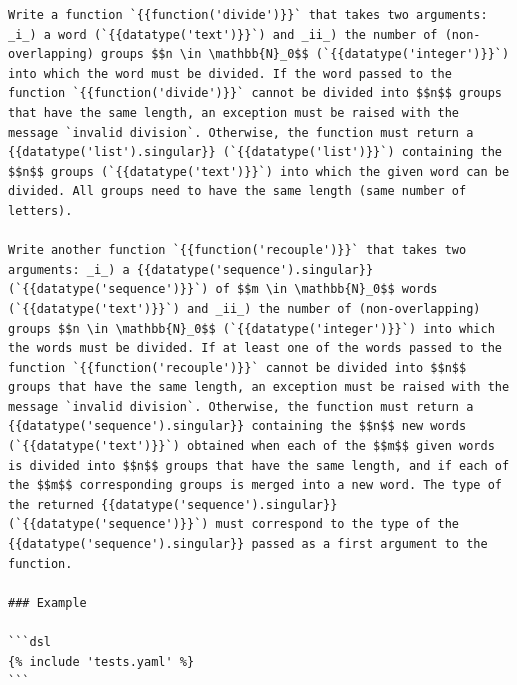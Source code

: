 \documentclass[../main]{subfiles}
\begin{document}
\begin{listing}
    \begin{verbatim}
Write a function `{{function('divide')}}` that takes two arguments: _i_) a word (`{{datatype('text')}}`) and _ii_) the number of (non-overlapping) groups $$n \in \mathbb{N}_0$$ (`{{datatype('integer')}}`) into which the word must be divided. If the word passed to the function `{{function('divide')}}` cannot be divided into $$n$$ groups that have the same length, an exception must be raised with the message `invalid division`. Otherwise, the function must return a {{datatype('list').singular}} (`{{datatype('list')}}`) containing the $$n$$ groups (`{{datatype('text')}}`) into which the given word can be divided. All groups need to have the same length (same number of letters).

Write another function `{{function('recouple')}}` that takes two arguments: _i_) a {{datatype('sequence').singular}} (`{{datatype('sequence')}}`) of $$m \in \mathbb{N}_0$$ words (`{{datatype('text')}}`) and _ii_) the number of (non-overlapping) groups $$n \in \mathbb{N}_0$$ (`{{datatype('integer')}}`) into which the words must be divided. If at least one of the words passed to the function `{{function('recouple')}}` cannot be divided into $$n$$ groups that have the same length, an exception must be raised with the message `invalid division`. Otherwise, the function must return a {{datatype('sequence').singular}} containing the $$n$$ new words (`{{datatype('text')}}`) obtained when each of the $$m$$ given words is divided into $$n$$ groups that have the same length, and if each of the $$m$$ corresponding groups is merged into a new word. The type of the returned {{datatype('sequence').singular}} (`{{datatype('sequence')}}`) must correspond to the type of the {{datatype('sequence').singular}} passed as a first argument to the function.

### Example

```dsl
{% include 'tests.yaml' %}
```
    \end{verbatim}
    \caption[]{
        Language-agnostic task description for the ``Recoupling'' exercise.
        The Kramdown-flavored Markdown contains Jinja2 placeholders for function names and both formal and informal names of data types.
        The task description ends with some examples that illustrate how the two functions should be used.
        The sample code is denoted using the same specification of the test suite for the programming exercise in TESTed-DSL format (\vref{lst:recouple-example}).
    }
    \label{lst:task-description-markdown}
\end{listing}
\end{document}
